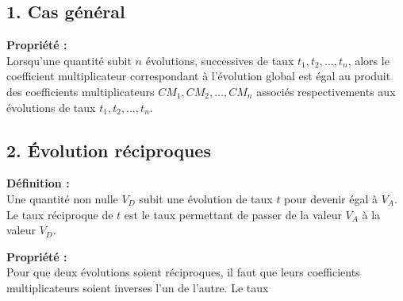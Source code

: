 \documentclass[11pt,a4paper]{article}
\begin{document}
\subsection*{1. Cas général}

\begin{mdframed}[style=proprieteStyle]
    \textbf{Propriété :} ~\\
    Lorsqu'une quantité subit $n$ évolutions, successives de taux $t_1, t_2,\dots,t_n$, alors le coefficient multiplicateur correspondant à l'évolution global est égal au produit des coefficients multiplicateurs $CM_1,CM_2,\dots,CM_n$ associés respectivements aux évolutions de taux $t_1, t_2,\dots,t_n$.
\end{mdframed}

\subsection*{2. Évolution réciproques}

\begin{mdframed}[style=definitionStyle]
    \textbf{Définition :} ~\\
    Une quantité non nulle $V_D$ subit une évolution de taux $t$ pour devenir égal à $V_A$.
    Le taux réciproque de $t$ est le taux permettant de passer de la valeur $V_A$ à la valeur $V_D$.
\end{mdframed}

\begin{mdframed}[style=proprieteStyle]
    \textbf{Propriété :} ~\\
    Pour que deux évolutions soient réciproques, il faut que leurs coefficients multiplicateurs soient inverses l'un de l'autre.
    Le taux
\end{mdframed}
\end{document}
